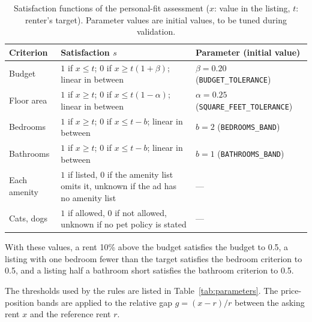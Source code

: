 \documentclass[12pt,a4paper]{report}
\begin{document}
\begin{table}[H]
\centering
\small
\caption{Satisfaction functions of the personal-fit assessment ($x$:
value in the listing, $t$: renter's target). Parameter values are initial
values, to be tuned during validation.}
\label{tab:satisfaction}
\begin{tabularx}{\textwidth}{p{2.4cm} X p{3.6cm}}
\toprule
\textbf{Criterion} & \textbf{Satisfaction $s$} & \textbf{Parameter (initial value)}\\
\midrule
Budget &
$1$ if $x \le t$; $0$ if $x \ge t(1+\beta)$; linear in between &
$\beta = 0.20$ (\texttt{BUDGET\_TOLERANCE})\\
\addlinespace
Floor area &
$1$ if $x \ge t$; $0$ if $x \le t(1-\alpha)$; linear in between &
$\alpha = 0.25$ (\texttt{SQUARE\_FEET\_TOLERANCE})\\
\addlinespace
Bedrooms &
$1$ if $x \ge t$; $0$ if $x \le t - b$; linear in between &
$b = 2$ (\texttt{BEDROOMS\_BAND})\\
\addlinespace
Bathrooms &
$1$ if $x \ge t$; $0$ if $x \le t - b$; linear in between &
$b = 1$ (\texttt{BATHROOMS\_BAND})\\
\addlinespace
Each amenity &
$1$ if listed, $0$ if the amenity list omits it, unknown if the ad has no
amenity list & ---\\
\addlinespace
Cats, dogs &
$1$ if allowed, $0$ if not allowed, unknown if no pet policy is stated & ---\\
\bottomrule
\end{tabularx}
\end{table}

With these values, a rent 10\% above the budget satisfies the budget to
0.5, a listing with one bedroom fewer than the target satisfies the
bedroom criterion to 0.5, and a listing half a bathroom short satisfies
the bathroom criterion to 0.5.

The thresholds used by the rules are listed in Table~\ref{tab:parameters}.
The price-position bands are applied to the relative gap $g = (x -
r)/r$ between the asking rent $x$ and the reference rent $r$.
\end{document}
